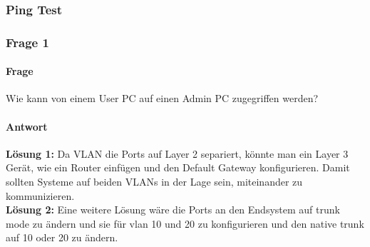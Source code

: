 \subsubsection{Ping Test}
\subsubsection{Frage 1}
\paragraph{Frage}
Wie kann von einem User PC auf einen Admin PC zugegriffen werden?
\paragraph{Antwort}
\textbf{Lösung 1:} Da VLAN die Ports auf Layer 2 separiert, könnte man ein Layer 3 Gerät, wie ein Router einfügen und den Default Gateway konfigurieren. Damit sollten Systeme auf beiden VLANs in der Lage sein, miteinander zu kommunizieren.
\\
\textbf{Lösung 2:} Eine weitere Lösung wäre die Ports an den Endsystem auf trunk mode zu ändern und sie für vlan 10 und 20 zu konfigurieren und den native trunk auf 10 oder 20 zu ändern.
